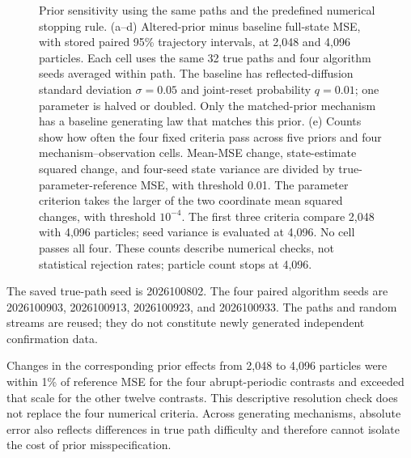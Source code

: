\documentclass[11pt,a4paper]{article}
\begin{document}
\begin{figure}[p]
\caption{Prior sensitivity using the same paths and the predefined numerical stopping rule. (a--d) Altered-prior minus baseline full-state MSE, with stored paired 95\% trajectory intervals, at 2,048 and 4,096 particles. Each cell uses the same 32 true paths and four algorithm seeds averaged within path. The baseline has reflected-diffusion standard deviation $\sigma=0.05$ and joint-reset probability $q=0.01$; one parameter is halved or doubled. Only the matched-prior mechanism has a baseline generating law that matches this prior. (e) Counts show how often the four fixed criteria pass across five priors and four mechanism--observation cells. Mean-MSE change, state-estimate squared change, and four-seed state variance are divided by true-parameter-reference MSE, with threshold 0.01. The parameter criterion takes the larger of the two coordinate mean squared changes, with threshold $10^{-4}$. The first three criteria compare 2,048 with 4,096 particles; seed variance is evaluated at 4,096. No cell passes all four. These counts describe numerical checks, not statistical rejection rates; particle count stops at 4,096.}
\label{fig:dynamics-prior-stability}
\end{figure}

The saved true-path seed is 2026100802. The four paired algorithm seeds are 2026100903, 2026100913, 2026100923, and 2026100933. The paths and random streams are reused; they do not constitute newly generated independent confirmation data.

Changes in the corresponding prior effects from 2,048 to 4,096 particles were within 1\% of reference MSE for the four abrupt-periodic contrasts and exceeded that scale for the other twelve contrasts. This descriptive resolution check does not replace the four numerical criteria. Across generating mechanisms, absolute error also reflects differences in true path difficulty and therefore cannot isolate the cost of prior misspecification.
\end{document}
